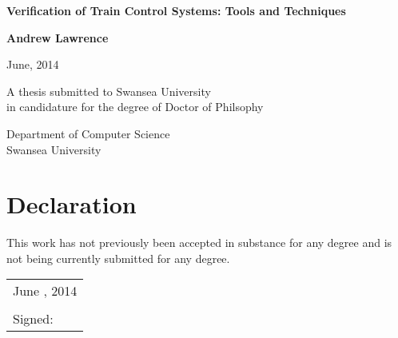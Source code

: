 \documentclass[11pt, a4paper, twoside, openright]{book}
\begin{document}
${ \ } $ \vspace{4cm}
%
%


\begin{center}
{\huge \bf Verification of Train Control Systems: Tools and Techniques}
\end{center}

\begin{center}
{\large \bf Andrew Lawrence}
\end{center}

\begin{center}
June, 2014
\end{center}

\vspace{2.5cm}



\vfill

\begin{center}
A thesis submitted to Swansea University\\
in candidature for the degree of Doctor of Philsophy
\end{center}

\begin{center}
\end{center}

\begin{center}
Department of Computer Science\\
Swansea University
\end{center}

\thispagestyle{empty}

\newpage
\thispagestyle{empty}

\mbox{}

\clearpage



\thispagestyle{empty}

\section*{Declaration}

This work has not previously been accepted in substance for any degree
and is not being currently submitted for any degree.

\vspace{0.5cm}
\begin{tabular}{l}
June , 2014\\
\\
Signed:
\end{tabular}
\end{document}
